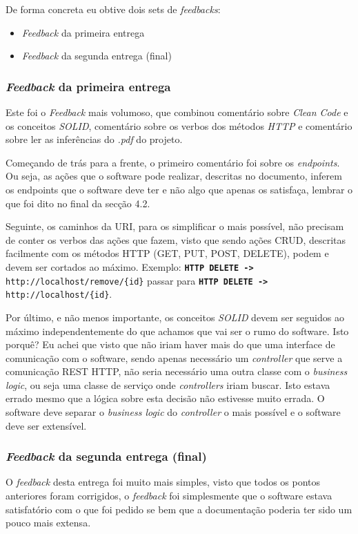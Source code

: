 De forma concreta eu obtive dois sets de \textit{feedbacks}:
\begin{itemize}
  \item \textit{Feedback} da primeira entrega
  \item \textit{Feedback} da segunda entrega (final)
\end{itemize}

\subsubsection{\textit{Feedback} da primeira entrega}

Este foi o \textit{Feedback} mais volumoso, que combinou comentário sobre \textit{Clean Code} e os conceitos \textit{SOLID}, comentário sobre os verbos dos métodos \textit{HTTP} e comentário sobre ler as inferências do \textit{.pdf} do projeto.

Começando de trás para a frente, o primeiro comentário foi sobre os \textit{endpoints}. Ou seja, as ações que o software pode realizar, descritas no documento, inferem os endpoints que o software deve ter e não algo que apenas os satisfaça, lembrar o que foi dito no final da secção 4.2.

Seguinte, os caminhos da URI, para os simplificar o mais possível, não precisam de conter os verbos das ações que fazem, visto que sendo ações CRUD, descritas facilmente com os métodos HTTP (GET, PUT, POST, DELETE), podem e devem ser cortados ao máximo. Exemplo: \texttt{\textbf{HTTP DELETE ->} http://localhost/remove/\{id\}} passar para \texttt{\textbf{HTTP DELETE ->} http://localhost/\{id\}}.

Por último, e não menos importante, os conceitos \textit{SOLID} devem ser seguidos ao máximo independentemente do que achamos que vai ser o rumo do software. Isto porquê? Eu achei que visto que não iriam haver mais do que uma interface de comunicação com o software, sendo apenas necessário um \textit{controller} que serve a comunicação REST HTTP, não seria necessário uma outra classe com o \textit{business logic}, ou seja uma classe de serviço onde \textit{controllers} iriam buscar. Isto estava errado mesmo que a lógica sobre esta decisão não estivesse muito errada. O software deve separar o \textit{business logic} do \textit{controller} o mais possível e o software deve ser extensível.

\subsubsection{\textit{Feedback} da segunda entrega (final)}

O \textit{feedback} desta entrega foi muito mais simples, visto que todos os pontos anteriores foram corrigidos, o \textit{feedback} foi simplesmente que o software estava satisfatório com o que foi pedido se bem que a documentação poderia ter sido um pouco mais extensa.